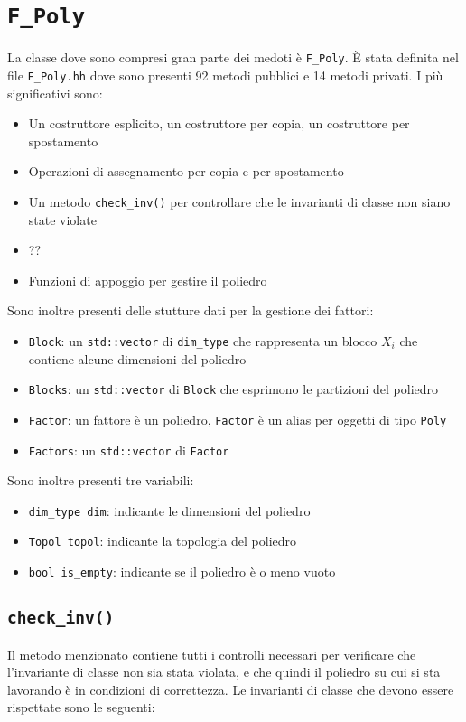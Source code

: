 \documentclass{mimosis}
\theoremstyle{definition}
\begin{document}
\section{\texttt{F\_Poly}}
\label{sec:org21350fd}
La classe dove sono compresi gran parte dei medoti è \texttt{F\_Poly}. È stata
definita nel file \texttt{F\_Poly.hh} dove sono presenti 92 metodi pubblici e 14 metodi
privati. I più significativi sono:

\begin{itemize}
\item Un costruttore esplicito, un costruttore per copia, un costruttore per spostamento
\item Operazioni di assegnamento per copia e per spostamento
\item Un metodo \texttt{check\_inv()} per controllare che le invarianti di classe non siano
state violate
\item ??
\item Funzioni di appoggio per gestire il poliedro
\end{itemize}

Sono inoltre presenti delle stutture dati per la gestione dei fattori:

\begin{itemize}
\item \texttt{Block}: un \texttt{std::vector} di \texttt{dim\_type} che rappresenta un blocco \(X_i\) che
contiene alcune dimensioni del poliedro
\item \texttt{Blocks}: un \texttt{std::vector} di \texttt{Block} che esprimono le partizioni del poliedro
\item \texttt{Factor}: un fattore è un poliedro, \texttt{Factor} è un alias per oggetti di tipo \texttt{Poly}
\item \texttt{Factors}: un \texttt{std::vector} di \texttt{Factor}
\end{itemize}

Sono inoltre presenti tre variabili:

\begin{itemize}
\item \texttt{dim\_type dim}: indicante le dimensioni del poliedro
\item \texttt{Topol topol}: indicante la topologia del poliedro
\item \texttt{bool is\_empty}: indicante se il poliedro è o meno vuoto
\end{itemize}

\subsection{\texttt{check\_inv()}}
\label{sec:orgfff8b8b}
Il metodo menzionato contiene tutti i controlli necessari per verificare che
l'invariante di classe non sia stata violata, e che quindi il poliedro su cui si
sta lavorando è in condizioni di correttezza. Le invarianti di classe che devono
essere rispettate sono le seguenti:
\end{document}
